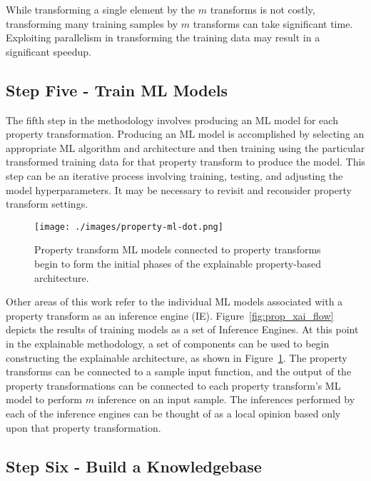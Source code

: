 While transforming a single element by the $m$ transforms is not costly,
transforming many training samples by $m$ transforms can take significant time.
Exploiting parallelism in transforming the training data may result in a
significant speedup.

\subsection{Step Five - Train ML Models} %

The fifth step in the methodology involves producing an ML model for each
property transformation. Producing an ML model is accomplished by selecting an
appropriate ML algorithm and architecture and then training using the particular
transformed training data for that property transform to produce the model. This
step can be an iterative process involving training, testing, and adjusting the
model hyperparameters. It may be necessary to revisit and reconsider property
transform settings.

\begin{figure}[h]
    \texttt{[image: ./images/property-ml-dot.png]}
    \caption{Property transform ML models connected to property transforms begin to form the initial phases of the explainable property-based architecture.}
    \label{fig:property_ml}
\end{figure}

Other areas of this work refer to the individual ML models associated with a
property transform as an inference engine (IE). Figure~\ref{fig:prop_xai_flow}
depicts the results of training models as a set of Inference Engines. At this
point in the explainable methodology, a set of components can be used to begin
constructing the explainable architecture, as shown in
Figure~\ref{fig:property_ml}. The property transforms can be connected to a
sample input function, and the output of the property transformations can be
connected to each property transform's ML model to perform $m$ inference on an
input sample. The inferences performed by each of the inference engines can be
thought of as a local opinion based only upon that property transformation.

\subsection{Step Six - Build a Knowledgebase} %

